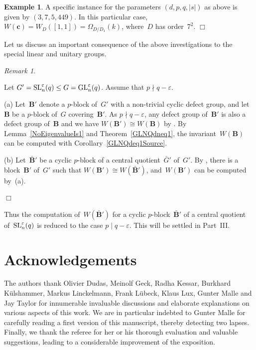 \documentclass[12pt]{amsart}
\newcommand{\bB}{{\mathbf{B}}}
\newcommand{\bc}{{\mathbf{c}}}
\def\GL{ \text{\rm GL} }
\def\SL{ \text{\rm SL} }
\theoremstyle{theorem}
\theoremstyle{definition}
\newtheorem{exmp}[thm]{Example}
\theoremstyle{remark}
\newtheorem{rem}[thm]{Remark}
\begin{document}
\begin{exmp}
{A specific instance for the parameters $(d,p,q,|s|)$ as above is given by
$(3,7,5,449)$. In this particular case, $W({\bc}) = W_D( [1,1] )
= \Omega_{D/D_1}( k )$, where~$D$ has order~$7^2$.
}\hfill $\Box$
\end{exmp}

Let us discuss an important consequence of the above investigations to the 
special linear and unitary groups. 

\begin{rem}
\label{SLNQdneq1}
{\rm
Let $G' = \SL_n^{\varepsilon}( q ) \leq G = \GL_n^{\varepsilon}(q)$. Assume that 
$p \nmid q - \varepsilon$. 

(a) Let~$\bB'$ denote a $p$-block of~$G'$ with a 
non-trivial cyclic defect group, and let~$\bB$ be a $p$-block of~$G$ 
covering~$\bB'$. As $p \nmid q - \varepsilon$, any defect group of~$\bB'$ is 
also a defect group of~$\bB$ and we have $W( \bB' ) \cong W( {\bB} )$ by 
\cite[Lemma~$4.3$]{HL24}. By Lemma~\ref{NoEigenvalueIs1} and 
Theorem~\ref{GLNQdneq1}, the invariant~$W( {\bB} )$ can be computed with
Corollary~\ref{GLNQdeq1Source}. 

(b) Let~$\bar{\bB}'$ be a cyclic $p$-block of a central quotient~$\bar{G}'$ 
of~$G'$. By \cite[Lemma~$4.1$]{HL24}, there is a block~$\bB'$ of~$G'$ such that
$W( \bB' ) \cong W( \bar{\bB}' )$, and~$W( \bB' )$ can be computed by~(a).
}\hfill $\Box$
\end{rem}

Thus the computation of~$W( \bar{\bB}' )$ for a cyclic 
$p$-block~$\bar{\bB}'$ of a central quotient of~$\SL_n^{\varepsilon}( q )$
is reduced to the case $p \mid q - \varepsilon$. This will be settled in 
Part~III.

\section*{Acknowledgements}

The authors thank Olivier Dudas, Meinolf Geck, Radha Kessar, 
Burkhard K{\"u}ls\-ham\-mer,
Markus Linckelmann, Frank L{\"u}beck,
Klaus Lux, Gunter Malle and Jay Taylor for innumerable invaluable discussions
and elaborate explanations on various aspects of this work.
We are in particular indebted to Gunter Malle for carefully reading a first 
version of this manuscript, thereby detecting two lapses.
Finally, we thank the referee for her or his thorough evaluation and valuable 
suggestions, leading to a considerable improvement of the exposition.
\end{document}
